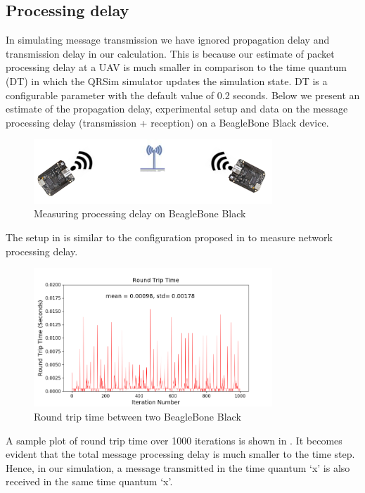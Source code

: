 \subsection{Processing delay}

In simulating message transmission we have ignored propagation delay and transmission delay in our calculation. This is because our estimate of packet processing delay at a UAV is much smaller in comparison to the time quantum (DT) in which the QRSim simulator updates the simulation state. DT is a configurable parameter with the default value of 0.2 seconds. Below we present an estimate of the propagation delay, experimental setup and data on the message processing delay (transmission + reception) on a BeagleBone Black device.
\begin{figure}[hbtp]
\centering
\includegraphics[width=0.8\textwidth]{Chapter-4/figs/beaglebone}
\caption{Measuring processing delay on BeagleBone Black}
\label{fig:proc_delay_setup}
\end{figure}
The setup in  is similar to the configuration proposed in \cite{1378257} to measure network processing delay.

\begin{figure}[hbtp]
\centering
\includegraphics[width=0.8\textwidth]{Chapter-4/figs/transmission_time}
\caption{Round trip time between two BeagleBone Black}
\label{fig:proc_delay_graph}
\end{figure}

A sample plot of round trip time over 1000 iterations is shown in . It becomes evident that the total message processing delay is much smaller to the time step. Hence, in our simulation, a message transmitted in the time quantum `x' is also received in the same time quantum `x'.

